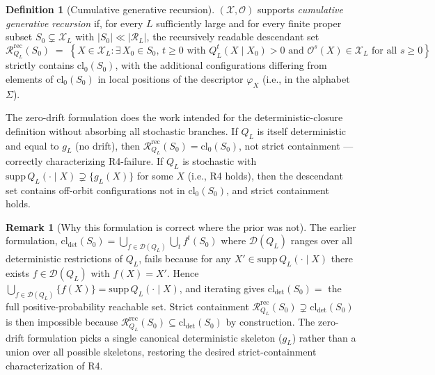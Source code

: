 \documentclass[11pt]{article}
\theoremstyle{plain}
\theoremstyle{definition}
\newtheorem{definition}[theorem]{Definition}
\newtheorem{remark}[theorem]{Remark}
\newcommand{\descX}{\varphi_X}
\newcommand{\Xset}{\mathcal{X}}
\newcommand{\Op}{\mathcal{O}}
\newcommand{\Reach}{\mathcal{R}}
\begin{document}
\begin{definition}[Cumulative generative recursion]
\label{def:cumulative_generation}
$(\Xset, \Op)$ supports \emph{cumulative generative recursion} if, for every $L$ sufficiently large and for every finite proper subset $S_0 \subsetneq \Xset_L$ with $|S_0| \ll |\Reach_L|$, the recursively readable descendant set
\begin{equation}
\Reach_{Q_L}^{\mathrm{rec}}(S_0) \;=\; \left\{ X \in \Xset_L : \exists\, X_0 \in S_0,\, t \ge 0 \text{ with } Q_L^t(X \mid X_0) > 0 \text{ and } \Op^s(X) \in \Xset_L \text{ for all } s \ge 0 \right\}
\end{equation}
strictly contains $\mathrm{cl}_0(S_0)$, with the additional configurations differing from elements of $\mathrm{cl}_0(S_0)$ in local positions of the descriptor $\descX$ (i.e., in the alphabet $\Sigma$).
\end{definition}

The zero-drift formulation does the work intended for the deterministic-closure definition without absorbing all stochastic branches. If $Q_L$ is itself deterministic and equal to $g_L$ (no drift), then $\Reach_{Q_L}^{\mathrm{rec}}(S_0) = \mathrm{cl}_0(S_0)$, not strict containment --- correctly characterizing R4-failure. If $Q_L$ is stochastic with $\mathrm{supp}\,Q_L(\cdot \mid X) \supsetneq \{g_L(X)\}$ for some $X$ (i.e., R4 holds), then the descendant set contains off-orbit configurations not in $\mathrm{cl}_0(S_0)$, and strict containment holds.

\begin{remark}[Why this formulation is correct where the prior was not]
\label{rem:cl0_correct}
The earlier formulation, $\mathrm{cl}_{\det}(S_0) = \bigcup_{f \in \mathcal{D}(Q_L)} \bigcup_t f^t(S_0)$ where $\mathcal{D}(Q_L)$ ranges over all deterministic restrictions of $Q_L$, fails because for any $X' \in \mathrm{supp}\,Q_L(\cdot \mid X)$ there exists $f \in \mathcal{D}(Q_L)$ with $f(X) = X'$. Hence $\bigcup_{f \in \mathcal{D}(Q_L)} \{f(X)\} = \mathrm{supp}\,Q_L(\cdot \mid X)$, and iterating gives $\mathrm{cl}_{\det}(S_0) = $ the full positive-probability reachable set. Strict containment $\Reach_{Q_L}^{\mathrm{rec}}(S_0) \supsetneq \mathrm{cl}_{\det}(S_0)$ is then impossible because $\Reach_{Q_L}^{\mathrm{rec}}(S_0) \subseteq \mathrm{cl}_{\det}(S_0)$ by construction. The zero-drift formulation picks a single canonical deterministic skeleton ($g_L$) rather than a union over all possible skeletons, restoring the desired strict-containment characterization of R4.
\end{remark}
\end{document}
